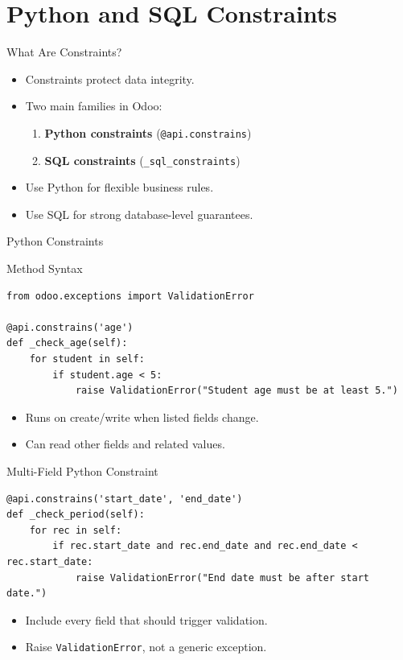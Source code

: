 \section{Python and SQL Constraints}

\begin{frame}{What Are Constraints?}
	\begin{itemize}
		\item Constraints protect data integrity.
		\item Two main families in Odoo:
		\begin{enumerate}
			\item \textbf{Python constraints} (\texttt{@api.constrains})
			\item \textbf{SQL constraints} (\texttt{\_sql\_constraints})
		\end{enumerate}
		\item Use Python for flexible business rules.
		\item Use SQL for strong database-level guarantees.
	\end{itemize}
\end{frame}

\begin{frame}[fragile]{Python Constraints}
\begin{block}{Method Syntax}
\begin{lstlisting}
from odoo.exceptions import ValidationError

@api.constrains('age')
def _check_age(self):
	for student in self:
		if student.age < 5:
			raise ValidationError("Student age must be at least 5.")
\end{lstlisting}
\end{block}
	\begin{itemize}
		\item Runs on create/write when listed fields change.
		\item Can read other fields and related values.
	\end{itemize}
\end{frame}

\begin{frame}[fragile]{Multi-Field Python Constraint}
\begin{lstlisting}
@api.constrains('start_date', 'end_date')
def _check_period(self):
	for rec in self:
		if rec.start_date and rec.end_date and rec.end_date < rec.start_date:
			raise ValidationError("End date must be after start date.")
\end{lstlisting}
	\begin{itemize}
		\item Include every field that should trigger validation.
		\item Raise \texttt{ValidationError}, not a generic exception.
	\end{itemize}
\end{frame}

